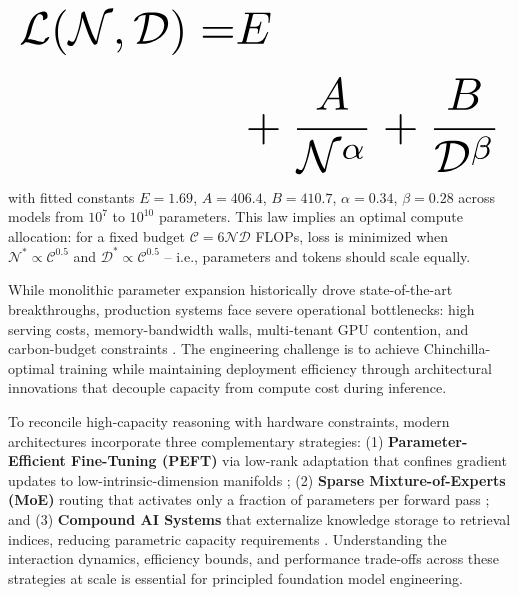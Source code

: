 \documentclass{article}
\begin{document}
\begin{equation}
\resizebox{\columnwidth}{!}{$\displaystyle
\begin{aligned}
\mathcal{L}(\mathcal{N}, \mathcal{D}) = & E \\
& + \frac{A}{\mathcal{N}^\alpha} + \frac{B}{\mathcal{D}^\beta}
\end{aligned}
$}
\end{equation}















with fitted constants $E = 1.69$, $A = 406.4$, $B = 410.7$, $\alpha = 0.34$, $\beta = 0.28$ across models from $10^7$ to $10^{10}$ parameters. This law implies an optimal compute allocation: for a fixed budget $\mathcal{C} = 6\mathcal{N}\mathcal{D}$ FLOPs, loss is minimized when $\mathcal{N}^* \propto \mathcal{C}^{0.5}$ and $\mathcal{D}^* \propto \mathcal{C}^{0.5}$ -- i.e., parameters and tokens should scale equally.

While monolithic parameter expansion historically drove state-of-the-art breakthroughs, production systems face severe operational bottlenecks: high serving costs, memory-bandwidth walls, multi-tenant GPU contention, and carbon-budget constraints \cite{arxiv_2406_00584,crossref_10_1109_access_2026_3656309}. The engineering challenge is to achieve Chinchilla-optimal training while maintaining deployment efficiency through architectural innovations that decouple capacity from compute cost during inference.

To reconcile high-capacity reasoning with hardware constraints, modern architectures incorporate three complementary strategies: (1) \textbf{Parameter-Efficient Fine-Tuning (PEFT)} via low-rank adaptation that confines gradient updates to low-intrinsic-dimension manifolds \cite{arxiv_2305_18290,arxiv_2208_14227}; (2) \textbf{Sparse Mixture-of-Experts (MoE)} routing that activates only a fraction of parameters per forward pass \cite{arxiv_2412_06333}; and (3) \textbf{Compound AI Systems} that externalize knowledge storage to retrieval indices, reducing parametric capacity requirements \cite{arxiv_2406_00584}. Understanding the interaction dynamics, efficiency bounds, and performance trade-offs across these strategies at scale is essential for principled foundation model engineering.
\end{document}
